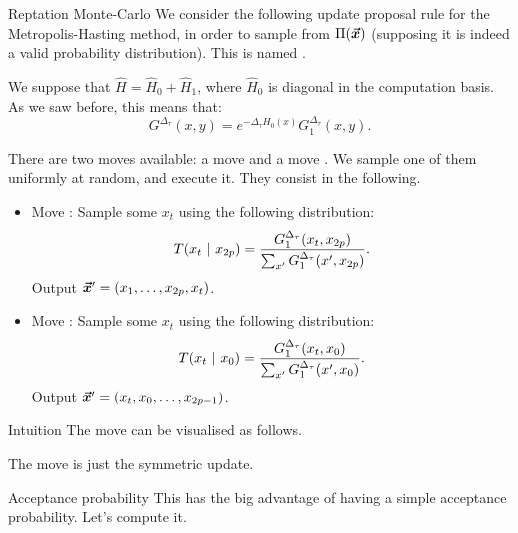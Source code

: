 \documentclass[a4paper]{article}
\begin{document}
\begin{parag}{Reptation Monte-Carlo}
    We consider the following update proposal rule for the Metropolis-Hasting method, in order to sample from $\Pi\left(\bvec{x}\right)$ (supposing it is indeed a valid probability distribution). This is named . 

    We suppose that $\hat{H} = \hat{H}_0 + \hat{H}_1$, where $\hat{H}_0$ is diagonal in the computation basis. As we saw before, this means that: 
    \[G^{\Delta_{\tau}}\left(x, y\right) = e^{-\Delta_{\tau} H_0\left(x\right)} G_1^{\Delta_{\tau}}\left(x, y\right).\]

    There are two moves available: a move  and a move . We sample one of them uniformly at random, and execute it. They consist in the following.
    \begin{itemize}
        \item Move : Sample some $x_t$ using the following distribution: 
        \[T\left(x_t \suchthat x_{2p}\right) = \frac{G_{1}^{\Delta_{\tau}}\left(x_t, x_{2p}\right)}{\sum_{x'} G_1^{\Delta_{\tau}}\left(x', x_{2p}\right)}.\]
        Output $\bvec{x}' = \left(x_1, \ldots, x_{2p}, x_t\right)$.
        \item Move : Sample some $x_t$ using the following distribution:
        \[T\left(x_t \suchthat x_{0}\right) = \frac{G_{1}^{\Delta_{\tau}}\left(x_t, x_0\right)}{\sum_{x'} G_1^{\Delta_{\tau}}\left(x', x_{0}\right)}.\]
        Output $\bvec{x}' = \left(x_t, x_0, \ldots, x_{2p-1}\right)$.
    \end{itemize}

    \begin{subparag}{Intuition}
        The move  can be visualised as follows.

        The move  is just the symmetric update.
    \end{subparag}

    \begin{subparag}{Acceptance probability}
        This has the big advantage of having a simple acceptance probability. Let's compute it.


\end{subparag}
\end{parag}
\end{document}

